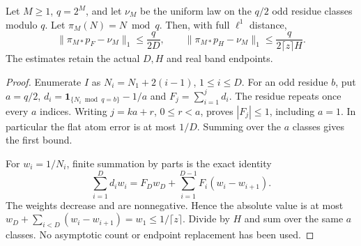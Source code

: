 \begin{proposition}
\label{prop:Mazur-band-residues}
Let $M\ge1$, $q=2^M$, and let $\nu_M$ be the uniform law on the
$q/2$ odd residue classes modulo $q$. Let $\pi_M(N)=N\bmod q$.
Then, with full $\ell^1$ distance,
\begin{equation}
 \|\pi_{M*}p_F-\nu_M\|_1\le\frac{q}{2D},\qquad
 \|\pi_{M*}p_H-\nu_M\|_1\le\frac{q}{2\lceil z\rceil H}.
 \label{eq:Mazur-band-residues}
\end{equation}
The estimates retain the actual $D,H$ and real band endpoints.
\end{proposition}
\begin{proof}
Enumerate $I$ as $N_i=N_1+2(i-1)$, $1\le i\le D$.
For an odd residue $b$, put $a=q/2$,
$d_i=\mathbf1_{\{N_i\bmod q=b\}}-1/a$ and
$F_j=\sum_{i=1}^j d_i$. The residue repeats once every $a$ indices.
Writing $j=ka+r$, $0\le r<a$, proves $|F_j|\le1$,
including $a=1$. In particular the flat atom error is at most $1/D$.
Summing over the $a$ classes gives the first bound.

For $w_i=1/N_i$, finite summation by parts is the exact identity
\[
 \sum_{i=1}^D d_iw_i
 =F_Dw_D+\sum_{i=1}^{D-1}F_i(w_i-w_{i+1}).
\]
The weights decrease and are nonnegative. Hence the absolute value
is at most $w_D+\sum_{i<D}(w_i-w_{i+1})=w_1
\le1/\lceil z\rceil$. Divide by $H$ and sum over the same $a$
classes. No asymptotic count or endpoint replacement has been used.
\end{proof}

